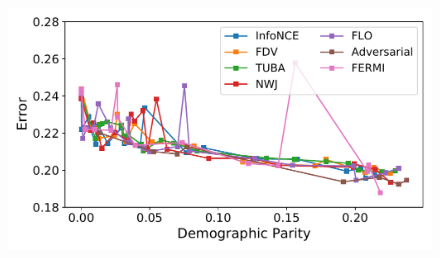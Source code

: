 \documentclass{article}
\theoremstyle{plain}
\theoremstyle{definition}
\theoremstyle{remark}
\newcommand{\infonce}{\texttt{InfoNCE}}
\newcommand{\TUBA}{\texttt{TUBA}}
\newcommand{\NWJ}{\texttt{NWJ}}
\newcommand{\FLO}{\texttt{FLO}}
\newcommand{\FDV}{\texttt{FDV}}
\begin{document}
					
				
				\begin{figure}[t!]
					\centering
					\begin{minipage}{.35\textwidth}
						\centering
							\begin{center}
								\includegraphics[width=1\textwidth]{figures/toy/adult.pdf}
							\end{center}
							\vspace{-1.5em}

\end{minipage}
\end{figure}
\end{document}
